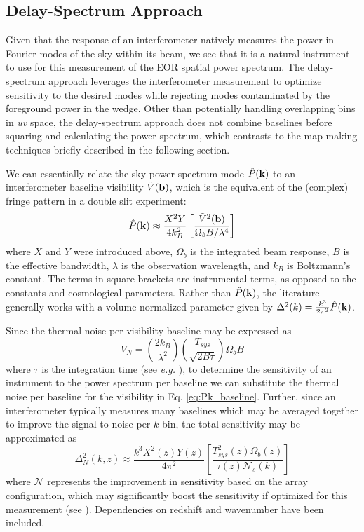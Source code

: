 \documentclass[preprint,11pt]{aastex}
\newcommand{\kvec}{{\bf k}}
\newcommand{\bvec}{{\bf b}}
\begin{document}
\subsection{Delay-Spectrum Approach}
\label{sec:delayapproach}
Given that the response of an interferometer natively measures the power in Fourier modes of the sky within its beam, we see that it is a natural instrument to use for this measurement of the EOR spatial power spectrum.  The delay-spectrum approach leverages the interferometer measurement to optimize sensitivity to the desired modes while rejecting modes contaminated by the foreground power in the wedge.  Other than potentially handling overlapping bins in {\em uv} space, the delay-spectrum approach does not combine baselines before squaring and calculating the power spectrum, which contrasts to the map-making techniques briefly described in the following section.

We can essentially relate the sky power spectrum mode ${\hat P}(\kvec)$ to an interferometer baseline visibility ${\tilde V}(\bvec)$, which is the equivalent of the (complex) fringe pattern in a double slit experiment:
\begin{equation}
{\hat P}(\kvec) \approx\frac{X^2Y}{4k_B^2}   \left[\frac{{\tilde V}^2(\bvec)}{\Omega_b B/ \lambda^4} \right]
\label{eq:Pk_baseline}
\end{equation}
where $X$ and $Y$ were introduced above, $\Omega_b$ is the integrated beam response, $B$ is the effective bandwidth, $\lambda$ is the observation wavelength, and $k_B$ is Boltzmann's constant.  The terms in square brackets are instrumental terms, as opposed to the constants and cosmological parameters.  
Rather than ${\hat P}(\kvec)$, the literature generally works with a volume-normalized parameter given by $\Delta^2(k) = \frac{k^3}{2\pi^2}{\hat P}(\kvec)$.    

Since the thermal noise per visibility baseline may be expressed as
\begin{equation}
V_N = \left(\frac{2k_B}{\lambda^2}\right)\left(\frac{T_{sys}}{\sqrt{2B\tau}}\right)\Omega_b B
\label{eq:sensitivity_per_baseline}
\end{equation}
where $\tau$ is the integration time (see {\em e.g.} \citealt{thompson_et_al2001}),
to determine the sensitivity of an instrument to the power spectrum per baseline we can substitute the thermal noise per baseline for the visibility in Eq. \ref{eq:Pk_baseline}.  Further, since an interferometer typically measures many baselines which may be averaged together to improve the signal-to-noise per $k$-bin, the total sensitivity may be approximated as
\begin{equation}
\Delta^2_N (k,z)\approx \frac{k^3X^2(z)Y(z)}{4\pi^2} \left[\frac{T_{sys}^2(z)\Omega_b(z) }{\tau(z) \mathcal{N}_s(k)}\right]
\label{eq:sensitivity}
\end{equation}
where $\mathcal{N}$ represents the improvement in sensitivity based on the array configuration, which may significantly boost the sensitivity if optimized for this measurement (see \citealt{parsons_et_al2012b}).  Dependencies on redshift and wavenumber have been included.
\end{document}
